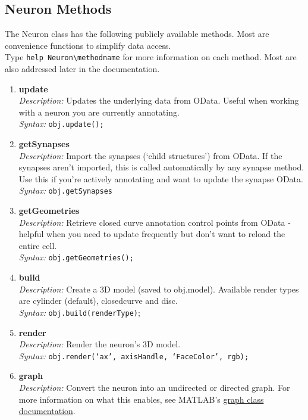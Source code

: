 \documentclass[12pt]{exam}
\begin{document}
	\subsection{Neuron Methods}
	The Neuron class has the following publicly available methods. Most are convenience functions to simplify data access.\\ Type \verb|help Neuron\methodname| for more information on each method. Most are also addressed later in the documentation.
	\begin{enumerate}
		\item \textbf{update}\\
		\textit{Description:} Updates the underlying data from OData. Useful when working with a neuron you are currently annotating.\\
		\textit{Syntax:} \texttt{obj.update();}
		\item \textbf{getSynapses}\\
		\textit{Description:} Import the synapses (`child structures') from OData. If the synapses aren't imported, this is called automatically by any synapse method. Use this if you're actively annotating and want to update the synapse OData.\\
		\textit{Syntax:} \texttt{obj.getSynapses}
		\item \textbf{getGeometries}\\
		\textit{Description:} Retrieve closed curve annotation control points from OData - helpful when you need to update frequently but don't want to reload the entire cell.\\
		\textit{Syntax:} \texttt{obj.getGeometries();}
		\item \textbf{build}\\
		\textit{Description:} Create a 3D model (saved to obj.model). Available render types are cylinder (default), closedcurve and disc.\\
		\textit{Syntax:} \texttt{obj.build(renderType)};
		\item \textbf{render}\\
		\textit{Description:} Render the neuron's 3D model.\\
		\textit{Syntax:} \texttt{obj.render(`ax', axisHandle, `FaceColor', rgb);}
		\item \textbf{graph}\\
		\textit{Description:} Convert the neuron into an undirected or directed graph. For more information on what this enables, see MATLAB's \href{https://www.mathworks.com/help/matlab/graph-and-network-algorithms.html}{graph class documentation}.\\

\end{enumerate}
\end{document}
